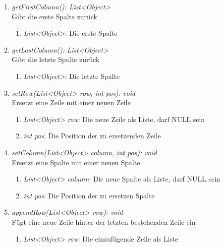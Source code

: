 \begin{enumerate}[+]
	\item \textit{getFirstColumn(): List<Object>} \\
	Gibt die erste Spalte zurück
	\vspace{-0.2cm}
	\begin{enumerate}[$\circ$]
		\item \textit{List<Object>}: Die erste Spalte
	\end{enumerate}
	
	\item \textit{getLastColumn(): List<Object>} \\
	Gibt die letzte Spalte zurück
	\vspace{-0.2cm}
	\begin{enumerate}[$\circ$]
		\item \textit{List<Object>}: Die letzte Spalte
	\end{enumerate}
	
	\item \textit{setRow(List<Object> row, int pos): void} \\
	Ersetzt eine Zeile mit einer neuen Zeile
	\begin{enumerate}[$\bullet$]
		\item \textit{List<Object> row}: Die neue Zeile als Liste, darf NULL sein
		\item \textit{int pos}: Die Position der zu ersetzenden Zeile
	\end{enumerate}
	\vspace{-0.2cm}
	
	\item \textit{setColumn(List<Object> column, int pos): void} \\
	Ersetzt eine Spalte mit einer neuen Spalte
	\begin{enumerate}[$\bullet$]
		\item \textit{List<Object> column}: Die neue Spalte als Liste, darf NULL sein
		\item \textit{int pos}: Die Position der zu ersetzen Spalte
	\end{enumerate}
	\vspace{-0.2cm}
	
	\item \textit{appendRow(List<Object> row): void} \\
	Fügt eine neue Zeile hinter der letzten bestehenden Zeile ein
	\begin{enumerate}[$\bullet$]
		\item \textit{List<Object> row}: Die einzufügende Zeile als Liste
	\end{enumerate}
	\vspace{-0.2cm}
	

\end{enumerate}
